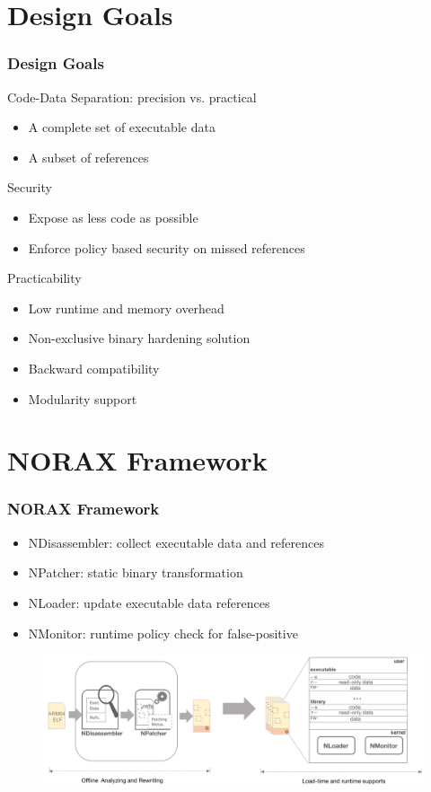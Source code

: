 \documentclass[aspectratio=169]{beamer}
\begin{document}

\section{Design Goals}
\begin{frame}
\frametitle{Design Goals}
\begin{block}{Code-Data Separation: precision vs. practical}
\begin{itemize}
\item A complete set of executable data
\item A subset of references
\end{itemize}
\end{block}
\pause
\begin{block}{Security}
\begin{itemize}
\item Expose as less code as possible
\item Enforce policy based security on missed references
\end{itemize}
\end{block}
\pause
\begin{block}{Practicability}
\begin{itemize}
\item Low runtime and memory overhead
\item Non-exclusive binary hardening solution
\item Backward compatibility
\item Modularity support
\end{itemize}
\end{block}
\end{frame}


\section{NORAX Framework}
\begin{frame}
\frametitle{NORAX Framework}
\begin{itemize}
\item NDisassembler: collect executable data and references
\item NPatcher: static binary transformation
\item NLoader: update executable data references
\item NMonitor: runtime policy check for false-positive
\end{itemize}
\begin{figure}
\includegraphics[width=1.0\linewidth]{figures/framework.pdf}
\end{figure}
\end{frame}
\end{document}
